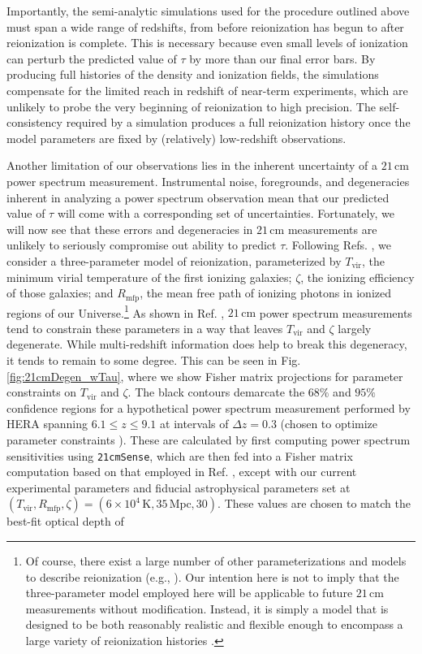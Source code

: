 \documentclass[twocolumn,aps,prd,nofootinbib,showpacs,superscriptaddress]{revtex4-1}
\begin{document}
Importantly, the semi-analytic simulations used for the procedure outlined above must span a wide range of redshifts, from before reionization has begun to after reionization is complete. This is necessary because even small levels of ionization can perturb the predicted value of $\tau$ by more than our final error bars. By producing full histories of the density and ionization fields, the simulations compensate for the limited reach in redshift of near-term experiments, which are unlikely to probe the very beginning of reionization to high precision. The self-consistency required by a simulation produces a full reionization history once the model parameters are fixed by (relatively) low-redshift observations.

Another limitation of our observations lies in the inherent uncertainty of a $21\,\textrm{cm}$ power spectrum measurement. Instrumental noise, foregrounds, and degeneracies inherent in analyzing a power spectrum observation mean that our predicted value of $\tau$ will come with a corresponding set of uncertainties. Fortunately, we will now see that these errors and degeneracies in $21\,\textrm{cm}$ measurements are unlikely to seriously compromise out ability to predict $\tau$. Following Refs. \cite{mesinger_et_al2012,pober_et_al2014}, we consider a three-parameter model of reionization, parameterized by $T_\textrm{vir}$, the minimum virial temperature of the first ionizing galaxies; $\zeta$, the ionizing efficiency of those galaxies; and $R_\textrm{mfp}$, the mean free path of ionizing photons in ionized regions of our Universe.\footnote{Of course, there exist a large number of other parameterizations and models to describe reionization (e.g., \cite{zahn_et_al2011,battaglia_et_al2013,laplante_et_al2014,gnedin_et_al2014,kaurov2015}). Our intention here is not to imply that the three-parameter model employed here will be applicable to future $21\,\textrm{cm}$ measurements without modification. Instead, it is simply a model that is designed to be both reasonably realistic and flexible enough to encompass a large variety of reionization histories \cite{mesinger_et_al2012}.} As shown in Ref. \cite{pober_et_al2014}, $21\,\textrm{cm}$ power spectrum measurements tend to constrain these parameters in a way that leaves $T_\textrm{vir}$ and $\zeta$ largely degenerate. While multi-redshift information does help to break this degeneracy, it tends to remain to some degree. This can be seen in Fig. \ref{fig:21cmDegen_wTau}, where we show Fisher matrix projections for parameter constraints on $T_\textrm{vir}$ and $\zeta$. The black contours demarcate the $68\%$ and $95\%$ confidence regions for a hypothetical power spectrum measurement performed by HERA spanning $6.1 \leq z \leq 9.1$ at intervals of $\Delta z = 0.3$ (chosen to optimize parameter constraints \cite{Liu_in_prep}). These are calculated by first computing power spectrum sensitivities using {\tt 21cmSense}, which are then fed into a Fisher matrix computation based on that employed in Ref. \cite{pober_et_al2014}, except with our current experimental parameters and fiducial astrophysical parameters set at $(T_\textrm{vir}, R_\textrm{mfp}, \zeta) = (6 \times 10^4\,\textrm{K}, 35\,\textrm{Mpc}, 30)$. These values are chosen to match the best-fit optical depth of 
\end{document}
